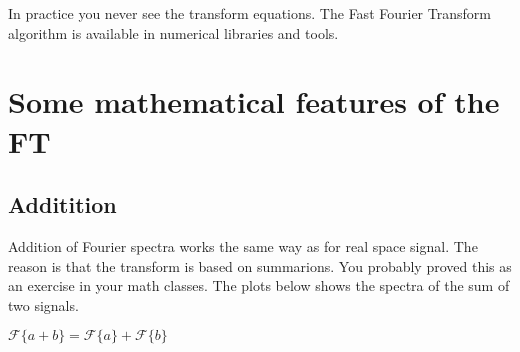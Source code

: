 \documentclass[letterpaper,10pt,english]{sphinxmanual}
\begin{document}
\sphinxAtStartPar
In practice \sphinxhyphen{} you never see the transform equations.
The Fast Fourier Transform algorithm is available in numerical libraries and tools.

\sphinxAtStartPar
{}


\section{Some mathematical features of the FT}
\label{\detokenize{02-ImageEnhancement:some-mathematical-features-of-the-ft}}

\subsection{Additition}
\label{\detokenize{02-ImageEnhancement:additition}}
\sphinxAtStartPar
Addition of Fourier spectra works the same way as for real space signal. The reason is that the transform is based on summarions. You probably proved this as an exercise in your math classes. The plots below shows the spectra of the sum of two signals.

\sphinxAtStartPar
\(\mathcal{F}\{a+b\} = \mathcal{F}\{a\}+\mathcal{F}\{b\}\)
\end{document}
